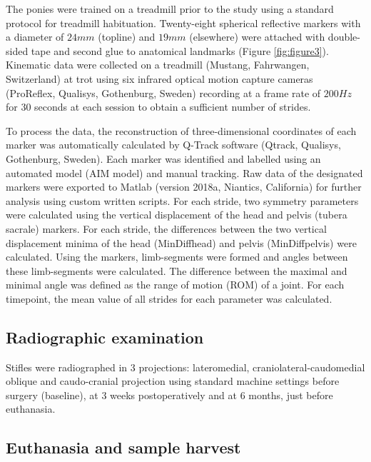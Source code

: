 \documentclass[twocolumn, empirical, authordate, issue]{jote-new-article}
\begin{document}
The ponies were trained on a treadmill prior to the study using a standard protocol for treadmill habituation. Twenty-eight spherical reflective markers with a diameter of $24 mm$ (topline) and $19 mm$ (elsewhere) were attached with double-sided tape and second glue to anatomical landmarks (Figure \ref{fig:figure3}). Kinematic data were collected on a treadmill (Mustang, Fahrwangen, Switzerland) at trot using six infrared optical motion capture cameras (ProReflex, Qualisys, Gothenburg, Sweden) recording at a frame rate of $200 Hz$ for $30$ seconds at each session to obtain a sufficient number of strides.

To process the data, the reconstruction of three-dimensional coordinates of each marker was automatically calculated by Q-Track software (Qtrack, Qualisys, Gothenburg, Sweden). Each marker was identified and labelled using an automated model (AIM model) and manual tracking. Raw data of the designated markers were exported to Matlab (version 2018a, Niantics, California) for further analysis using custom written scripts. For each stride, two symmetry parameters were calculated using the vertical displacement of the head and pelvis (tubera sacrale) markers. For each stride, the differences between the two vertical displacement minima of the head (MinDiffhead) and pelvis (MinDiffpelvis) were calculated. Using the markers, limb-segments were formed and angles between these limb-segments were calculated. The difference between the maximal and minimal angle was defined as the range of motion (ROM) of a joint. For each timepoint, the mean value of all strides for each parameter was calculated.



\subsection{Radiographic examination} 

Stifles were radiographed in 3 projections: lateromedial, craniolateral-caudomedial oblique and caudo-cranial projection using standard machine settings before surgery (baseline), at 3 weeks postoperatively and at 6 months, just before euthanasia.

\subsection{Euthanasia and sample harvest} 
\end{document}
